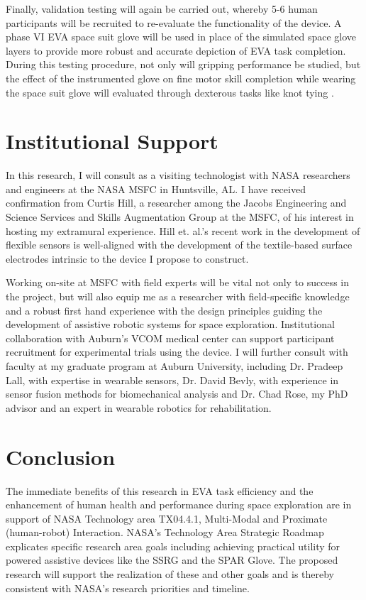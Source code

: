 \documentclass{article}
\begin{document}
Finally, validation testing will again be carried out, whereby 5-6 human participants will be recruited to re-evaluate the functionality of the device. A phase VI EVA space suit glove will be used in place of the simulated space glove layers to provide more robust and accurate depiction of EVA task completion. During this testing procedure, not only will gripping performance be studied, but the effect of the instrumented glove on fine motor skill completion while wearing the space suit glove will evaluated through dexterous tasks like knot tying \cite{Rogers2017DevelopmentAT}.

\section{Institutional Support} In this research, I will consult as a visiting technologist with NASA researchers and engineers at the NASA MSFC in Huntsville, AL. I have received confirmation from Curtis Hill, a researcher among the Jacobs Engineering and Science Services and Skills Augmentation Group at the MSFC, of his interest in hosting my extramural experience. Hill et. al.'s recent work in the development of flexible sensors is well-aligned with the development of the textile-based surface electrodes intrinsic to the device I propose to construct. 

Working on-site at MSFC with field experts will be vital not only to success in the project, but will also equip me as a researcher with field-specific knowledge and a robust first hand experience with the design principles guiding the development of assistive robotic systems for space exploration. Institutional collaboration with Auburn’s VCOM medical center can support participant recruitment for experimental trials using the device. I will further consult with faculty at my graduate program at Auburn University, including Dr. Pradeep Lall, with expertise in wearable sensors, Dr. David Bevly, with experience in sensor fusion methods for biomechanical analysis and Dr. Chad Rose, my PhD advisor and an expert in wearable robotics for rehabilitation.

\section{Conclusion} The immediate benefits of this research in EVA task efficiency and the enhancement of human health and performance during space exploration are in support of NASA Technology area TX04.4.1, Multi-Modal and Proximate (human-robot) Interaction. NASA's Technology Area Strategic Roadmap explicates specific research area goals including achieving practical utility for powered assistive devices like the SSRG and the SPAR Glove. The proposed research will support the realization of these and other goals and is thereby consistent with NASA's research priorities and timeline.
\end{document}
